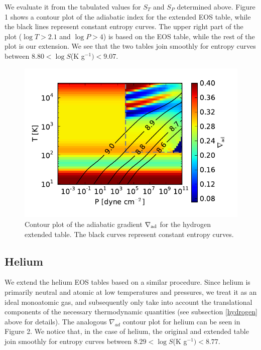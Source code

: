 \documentclass[apj]{emulateapj}
\newcommand{\delad}{\nabla_{\rm ad}}
\begin{document}
\begin{enumerate}
We evaluate it from the tabulated values for $S_T$ and $S_P$ determined above. Figure 1 shows a contour plot of the adiabatic index for the extended EOS table, while the black lines represent constant entropy curves. The upper right part of the plot ($\log T>2.1$ and $\log P>4$) is based on the \cite{saumon95} EOS table, while the rest of the plot is our extension. We see that the two tables join smoothly for entropy curves between $8.80<\log{S}$(K g$^{-1})<9.07$.

\end{enumerate}

\begin{figure}[h!]
\centering
\includegraphics[scale=.8]{../../figs/EOS/delad_S_H.pdf}
\caption{Contour plot of the adiabatic gradient $\delad$ for the hydrogen extended table. The black curves represent constant entropy curves.}
\end{figure}

\subsection{Helium}

We extend the helium EOS tables based on a similar procedure. Since helium is primarily neutral and atomic at low temperatures and pressures, we treat it as an ideal monoatomic gas, and subsequently only take into account the translational components of the necessary thermodynamic quantities (see subsection \ref{hydrogen} above for details). The analogous $\nabla_{ad}$ contour plot for helium can be seen in Figure 2. We notice that, in the case of helium, the original and extended table join smoothly for entropy curves between $8.29<\log{S}$(K g$^{-1})<8.77$.
\end{document}
